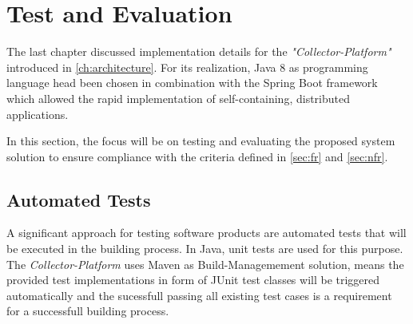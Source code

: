 \chapter{Test and Evaluation}
\label{ch:evaluation}
%
%

The last chapter discussed implementation details for the \textit{"Collector-Platform"} introduced in \autoref{ch:architecture}.
For its realization, Java 8 as programming language head been chosen in combination with the Spring Boot framework which allowed
the rapid implementation of self-containing, distributed applications.

In this section, the focus will be on testing and evaluating the proposed system solution to ensure compliance with the criteria
defined in \autoref{sec:fr} and \autoref{sec:nfr}.

\section{Automated Tests}

A significant approach for testing software products are automated tests that will be executed in the building process.
In Java, unit tests are used for this purpose. The \textit{Collector-Platform} uses Maven as Build-Managemement solution,
means the provided test implementations in form of JUnit test classes will be triggered automatically and the sucessfull passing
all existing test cases is a requirement for a successfull building process.

